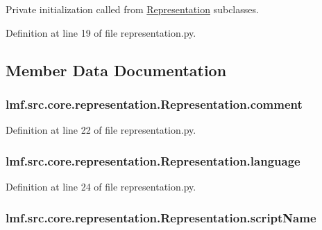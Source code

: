 Private initialization called from \hyperlink{classlmf_1_1src_1_1core_1_1representation_1_1_representation}{Representation} subclasses. 



Definition at line 19 of file representation.\+py.



\subsection{Member Data Documentation}
\hypertarget{classlmf_1_1src_1_1core_1_1representation_1_1_representation_a3442469787d13456fbaf6e5ee79037d5}{
\subsubsection[{comment}]{\setlength{\rightskip}{0pt plus 5cm}lmf.\+src.\+core.\+representation.\+Representation.\+comment}}\label{classlmf_1_1src_1_1core_1_1representation_1_1_representation_a3442469787d13456fbaf6e5ee79037d5}


Definition at line 22 of file representation.\+py.

\hypertarget{classlmf_1_1src_1_1core_1_1representation_1_1_representation_afc9334b238179d0a79d3ce1e13d4d304}{
\subsubsection[{language}]{\setlength{\rightskip}{0pt plus 5cm}lmf.\+src.\+core.\+representation.\+Representation.\+language}}\label{classlmf_1_1src_1_1core_1_1representation_1_1_representation_afc9334b238179d0a79d3ce1e13d4d304}


Definition at line 24 of file representation.\+py.

\hypertarget{classlmf_1_1src_1_1core_1_1representation_1_1_representation_a84dbae01d3e39cd1d4ac8d420372dce4}{
\subsubsection[{script\+Name}]{\setlength{\rightskip}{0pt plus 5cm}lmf.\+src.\+core.\+representation.\+Representation.\+script\+Name}}\label{classlmf_1_1src_1_1core_1_1representation_1_1_representation_a84dbae01d3e39cd1d4ac8d420372dce4}


